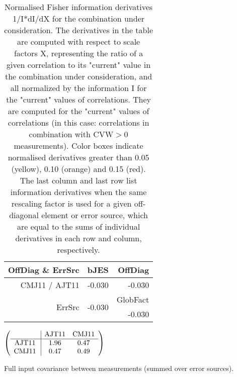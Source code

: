 \begin{table}[H]
\scriptsize
\begin{center}
\renewcommand{\arraystretch}{1.1}
\begin{tabular}{|r|r|r|}
\hline
 OffDiag \& ErrSrc & {\tiny bJES} & OffDiag\\
\hline
CMJ11 / AJT11 &     -0.030 &     -0.030 \\
\hline
\multirow{2}{*}{ErrSrc} & \multirow{2}{*}{    -0.030} & GlobFact\\
 & &     -0.030 \\
\hline
\end{tabular}
\renewcommand{\arraystretch}{1}
\caption{Normalised Fisher information derivatives 1/I*dI/dX for the combination under consideration. The derivatives in the table are computed with respect to scale factors X, representing the ratio of a given correlation to its "current" value in the combination under consideration, and all normalized by the information I for the "current" values of correlations. They are computed for the "current" values of correlations (in this case: correlations in combination with CVW$>$0 measurements). Color boxes indicate normalised derivatives greater than 0.05 (yellow), 0.10 (orange) and 0.15 (red). The last column and last row list information derivatives when the same rescaling factor is used for a given off-diagonal element or error source, which are equal to the sums of individual derivatives in each row and column, respectively.}
\end{center}
\end{table}
\begin{table}[H]
\scriptsize
\begin{center}
\renewcommand{\arraystretch}{1.1}
\begin{math}\left(\begin{array}{c|cc}
 & \mathrm{AJT11} & 
\mathrm{CMJ11} \\
\hline
\mathrm{AJT11} \hspace*{2pt} &       1.96 &       0.47 \\
\mathrm{CMJ11} \hspace*{2pt} &       0.47 &       0.49 \\
\end{array}\right)\end{math}
\caption{Full input covariance between measurements (summed over error sources).}
\renewcommand{\arraystretch}{1}
\end{center}
\end{table}

